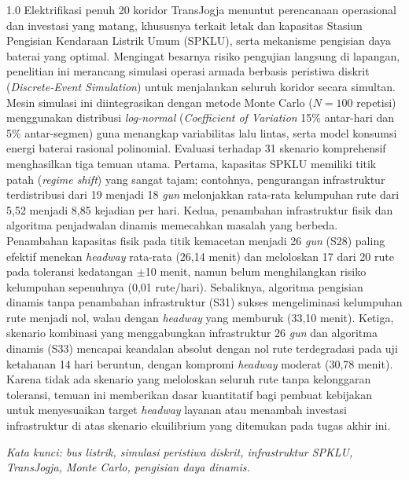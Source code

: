 \begin{spacing}{1.0}
Elektrifikasi penuh 20 koridor TransJogja menuntut perencanaan operasional dan investasi yang matang, khususnya terkait letak dan kapasitas Stasiun Pengisian Kendaraan Listrik Umum (SPKLU), serta mekanisme pengisian daya baterai yang optimal. Mengingat besarnya risiko pengujian langsung di lapangan, penelitian ini merancang simulasi operasi armada berbasis peristiwa diskrit (\textit{Discrete-Event Simulation}) untuk menjalankan seluruh koridor secara simultan. Mesin simulasi ini diintegrasikan dengan metode Monte Carlo ($N=100$ repetisi) menggunakan distribusi \textit{log-normal} (\textit{Coefficient of Variation} 15\% antar-hari dan 5\% antar-segmen) guna menangkap variabilitas lalu lintas, serta model konsumsi energi baterai rasional polinomial. Evaluasi terhadap 31 skenario komprehensif menghasilkan tiga temuan utama. Pertama, kapasitas SPKLU memiliki titik patah (\textit{regime shift}) yang sangat tajam; contohnya, pengurangan infrastruktur terdistribusi dari 19 menjadi 18 \textit{gun} melonjakkan rata-rata kelumpuhan rute dari 5,52 menjadi 8,85 kejadian per hari. Kedua, penambahan infrastruktur fisik dan algoritma penjadwalan dinamis memecahkan masalah yang berbeda. Penambahan kapasitas fisik pada titik kemacetan menjadi 26 \textit{gun} (S28) paling efektif menekan \textit{headway} rata-rata (26,14 menit) dan meloloskan 17 dari 20 rute pada toleransi kedatangan $\pm$10 menit, namun belum menghilangkan risiko kelumpuhan sepenuhnya (0,01 rute/hari). Sebaliknya, algoritma pengisian dinamis tanpa penambahan infrastruktur (S31) sukses mengeliminasi kelumpuhan rute menjadi nol, walau dengan \textit{headway} yang memburuk (33,10 menit). Ketiga, skenario kombinasi yang menggabungkan infrastruktur 26 \textit{gun} dan algoritma dinamis (S33) mencapai keandalan absolut dengan nol rute terdegradasi pada uji ketahanan 14 hari beruntun, dengan kompromi \textit{headway} moderat (30,78 menit). Karena tidak ada skenario yang meloloskan seluruh rute tanpa kelonggaran toleransi, temuan ini memberikan dasar kuantitatif bagi pembuat kebijakan untuk menyesuaikan target \textit{headway} layanan atau menambah investasi infrastruktur di atas skenario ekuilibrium yang ditemukan pada tugas akhir ini.

\vspace{0.5cm}
\noindent\textit{Kata kunci: bus listrik, simulasi peristiwa diskrit,
infrastruktur SPKLU, TransJogja, Monte Carlo, pengisian daya dinamis.}
\end{spacing}
